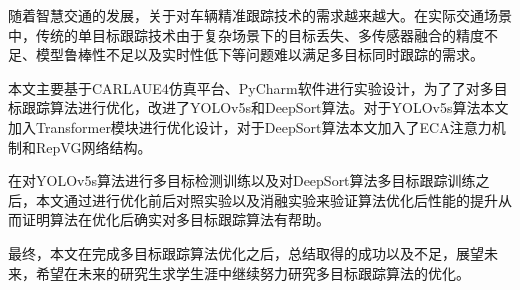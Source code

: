 \begin{abstractzh}
	
	随着智慧交通的发展，关于对车辆精准跟踪技术的需求越来越大。在实际交通场景中，传统的单目标跟踪技术由于复杂场景下的目标丢失、多传感器融合的精度不足、模型鲁棒性不足以及实时性低下等问题难以满足多目标同时跟踪的需求。
	
	本文主要基于CARLAUE4仿真平台、PyCharm软件进行实验设计，为了了对多目标跟踪算法进行优化，改进了YOLOv5s和DeepSort算法。对于YOLOv5s算法本文加入Transformer模块进行优化设计，对于DeepSort算法本文加入了ECA注意力机制和RepVG网络结构。
	
	在对YOLOv5s算法进行多目标检测训练以及对DeepSort算法多目标跟踪训练之后，本文通过进行优化前后对照实验以及消融实验来验证算法优化后性能的提升从而证明算法在优化后确实对多目标跟踪算法有帮助。
	
	最终，本文在完成多目标跟踪算法优化之后，总结取得的成功以及不足，展望未来，希望在未来的研究生求学生涯中继续努力研究多目标跟踪算法的优化。
	
	
	
	
	
	
	
\end{abstractzh}